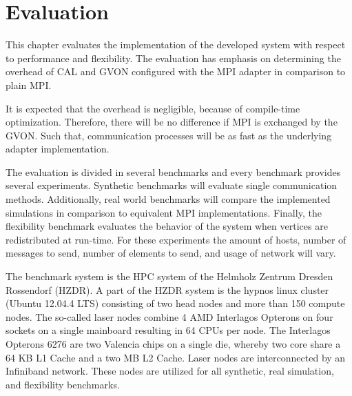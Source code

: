 \chapter{Evaluation}
\label{sec:evaluation}


This chapter evaluates the implementation of the developed
system with respect to performance and flexibility.  The
evaluation has emphasis on determining the overhead of CAL and GVON
configured with the MPI adapter in comparison to plain MPI.

It is expected that the overhead is negligible, because of
compile-time optimization. Therefore, there will be no difference if
MPI is exchanged by the GVON. Such that, communication processes will
be as fast as the underlying adapter implementation.

The evaluation is divided in several benchmarks and every benchmark
provides several experiments. Synthetic benchmarks will evaluate
single communication methods. Additionally, real world benchmarks
will compare the implemented simulations in comparison to equivalent
MPI implementations. Finally, the flexibility benchmark evaluates the
behavior of the system when vertices are redistributed at run-time.
For these experiments the amount of hosts, number of messages to send,
number of elements to send, and usage of network will vary.

The benchmark system is the HPC system of the Helmholz
Zentrum Dresden Rossendorf (HZDR)\cite{ref:hzdr_cluster}.
A part of the HZDR system is the hypnos linux cluster (Ubuntu 12.04.4
LTS) consisting of two head nodes and more than 150 compute nodes.
The so-called laser nodes combine 4 AMD Interlagos Opterons on four
sockets on a single mainboard resulting in 64 CPUs per node.  The
Interlagos Opterons 6276 are two Valencia chips on a single die,
whereby two core share a 64 KB L1 Cache and a two MB L2 Cache. Laser nodes
are interconnected by an Infiniband network. These nodes are utilized
for all synthetic, real simulation, and flexibility benchmarks.

